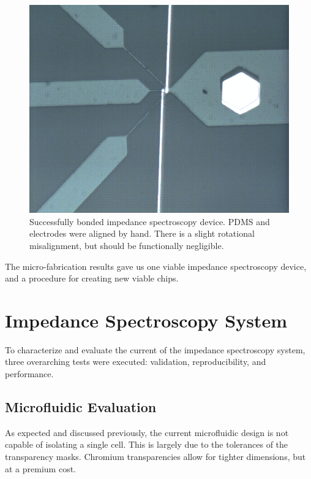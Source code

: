 \begin{figure}[h]
    \centering
    \includegraphics[width=\textwidth]{images/good_device.png}
    \caption{Successfully bonded impedance spectroscopy device. PDMS and electrodes were aligned by hand. There is a slight rotational misalignment, but should be functionally negligible.}
    \label{fig:good_device}
\end{figure}

\par The micro-fabrication results gave us one viable impedance spectroscopy device, and a procedure for creating new viable chips.

\FloatBarrier

\section{Impedance Spectroscopy System}

\par To characterize and evaluate the current of the impedance spectroscopy system, three overarching tests were executed: validation, reproducibility, and performance.

\subsection{Microfluidic Evaluation}

\par As expected and discussed previously, the current microfluidic design is not capable of isolating a single cell. This is largely due to the tolerances of the transparency masks. Chromium transparencies allow for tighter dimensions, but at a premium cost. 

